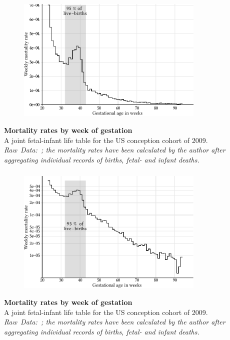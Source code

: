 \documentclass{beamer}
\begin{document}
\begin{frame}
\frametitle{\insertsection}

\begin{figure}[htb!]
\includegraphics[width = 0.8\textwidth]{./fig/us_fimort_2009_mx.pdf}\\
\end{figure}

\footnotesize\textbf{Mortality rates by week of gestation}\\
A joint fetal-infant life table for the US conception cohort of 2009.\\
\scriptsize\emph{Raw~Data:~\textcite{DVS2015}; the mortality rates have been calculated by the author after aggregating individual records of births, fetal- and infant deaths.}

\end{frame}


\begin{frame}
\frametitle{\insertsection}

\begin{figure}[htb!]
\includegraphics[width = 0.8\textwidth]{./fig/us_fimort_2009_log_mx.pdf}\\
\end{figure}

\footnotesize\textbf{Mortality rates by week of gestation}\\
A joint fetal-infant life table for the US conception cohort of 2009.\\
\scriptsize\emph{Raw~Data:~\textcite{DVS2015}; the mortality rates have been calculated by the author after aggregating individual records of births, fetal- and infant deaths.}

\end{frame}
\end{document}
